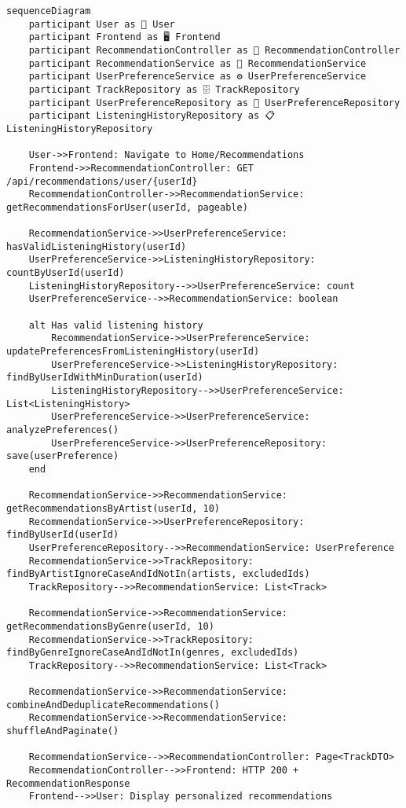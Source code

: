 \begin{verbatim}
sequenceDiagram
    participant User as 👤 User
    participant Frontend as 🖥️ Frontend
    participant RecommendationController as 🎯 RecommendationController
    participant RecommendationService as 🤖 RecommendationService
    participant UserPreferenceService as ⚙️ UserPreferenceService
    participant TrackRepository as 🗄️ TrackRepository
    participant UserPreferenceRepository as 👥 UserPreferenceRepository
    participant ListeningHistoryRepository as 📋 ListeningHistoryRepository

    User->>Frontend: Navigate to Home/Recommendations
    Frontend->>RecommendationController: GET /api/recommendations/user/{userId}
    RecommendationController->>RecommendationService: getRecommendationsForUser(userId, pageable)
    
    RecommendationService->>UserPreferenceService: hasValidListeningHistory(userId)
    UserPreferenceService->>ListeningHistoryRepository: countByUserId(userId)
    ListeningHistoryRepository-->>UserPreferenceService: count
    UserPreferenceService-->>RecommendationService: boolean
    
    alt Has valid listening history
        RecommendationService->>UserPreferenceService: updatePreferencesFromListeningHistory(userId)
        UserPreferenceService->>ListeningHistoryRepository: findByUserIdWithMinDuration(userId)
        ListeningHistoryRepository-->>UserPreferenceService: List<ListeningHistory>
        UserPreferenceService->>UserPreferenceService: analyzePreferences()
        UserPreferenceService->>UserPreferenceRepository: save(userPreference)
    end
    
    RecommendationService->>RecommendationService: getRecommendationsByArtist(userId, 10)
    RecommendationService->>UserPreferenceRepository: findByUserId(userId)
    UserPreferenceRepository-->>RecommendationService: UserPreference
    RecommendationService->>TrackRepository: findByArtistIgnoreCaseAndIdNotIn(artists, excludedIds)
    TrackRepository-->>RecommendationService: List<Track>
    
    RecommendationService->>RecommendationService: getRecommendationsByGenre(userId, 10)
    RecommendationService->>TrackRepository: findByGenreIgnoreCaseAndIdNotIn(genres, excludedIds)
    TrackRepository-->>RecommendationService: List<Track>
    
    RecommendationService->>RecommendationService: combineAndDeduplicateRecommendations()
    RecommendationService->>RecommendationService: shuffleAndPaginate()
    
    RecommendationService-->>RecommendationController: Page<TrackDTO>
    RecommendationController-->>Frontend: HTTP 200 + RecommendationResponse
    Frontend-->>User: Display personalized recommendations
\end{verbatim}

